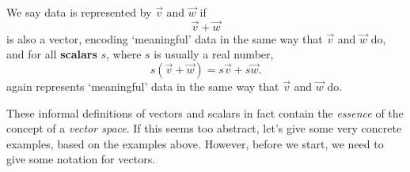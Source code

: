 \documentclass{ximera}
\begin{document}
\begin{definition}
  We say data is represented by  $\vec{v}$ and $\vec{w}$
  if
  \[
  \vec{v}+\vec{w}
  \]
  is also a vector, encoding `meaningful' data in the same way that
  $\vec{v}$ and $\vec{w}$ do, and for all \textbf{scalars} $s$, where
  $s$ is usually a real number,
  \[
  s(\vec{v} + \vec{w}) = s\vec{v}+ s\vec{w}.
  \]
  again represents `meaningful' data in the same way that $\vec{v}$
  and $\vec{w}$ do.
\end{definition}
These informal definitions of vectors and scalars in fact contain the
\textit{essence} of the concept of a \textit{vector space}. If this
seems too abstract, let's give some very concrete examples, based on
the examples above. However, before we start, we need to give some
notation for vectors.
\end{document}

